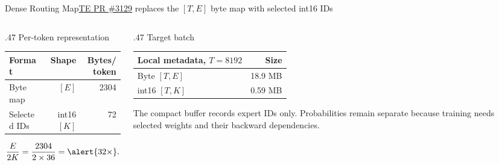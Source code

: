 \documentclass[aspectratio=169,10pt]{beamer}
\renewcommand{\NvidiaSource}[1]{}
\begin{document}
\begin{frame}{Dense Routing Map}{\href{https://github.com/NVIDIA/TransformerEngine/pull/3129}{TE PR \#3129} replaces the $[T,E]$ byte map with selected int16 IDs}
  \NvidiaSource{TE PR \href{https://github.com/NVIDIA/TransformerEngine/pull/3129}{\#3129};
    \texttt{notes/dense\_routing\_rebase\_design.md}}
  \begin{columns}[T,onlytextwidth]
    \begin{column}{.47\textwidth}
      {\NvidiaSansMedium Per-token representation}\NvidiaTightRule{.6pt}\vspace{.08in}
      \begin{tabularx}{\linewidth}{@{}>{\NvidiaSansMedium}X r r@{}}
        Format & Shape & Bytes/token \\
        \midrule
        Byte map & $[E]$ & 2304 \\
        Selected IDs & int16 $[K]$ & 72
      \end{tabularx}
      \[
        \frac{E}{2K}=\frac{2304}{2\times36}=\alert{32\times}.
      \]
    \end{column}
    \begin{column}{.47\textwidth}
      {\NvidiaSansMedium Target batch}\NvidiaTightRule{.6pt}\vspace{.08in}
      \begin{tabularx}{\linewidth}{@{}>{\NvidiaSansMedium}X r@{}}
        Local metadata, $T=8192$ & Size \\
        \midrule
        Byte $[T,E]$ & 18.9 MB \\
        int16 $[T,K]$ & 0.59 MB
      \end{tabularx}
      \vspace{.10in}
      \small The compact buffer records expert IDs only. Probabilities remain separate because
      training needs selected weights and their backward dependencies.
    \end{column}
  \end{columns}
\end{frame}
\end{document}
